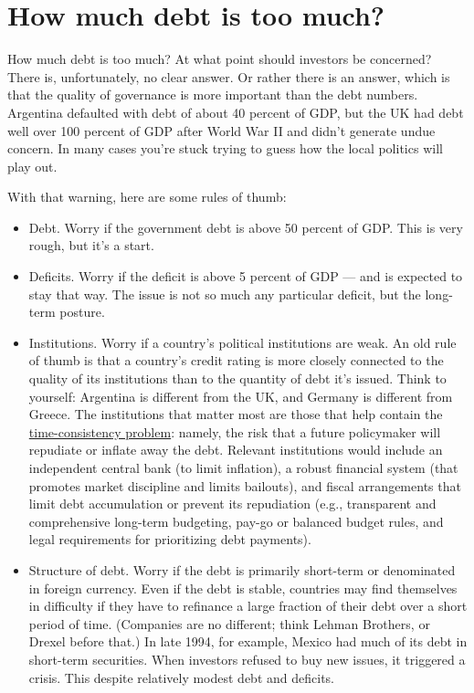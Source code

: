 \section{How much debt is too much?}

How much debt is too much?
At what point should investors be concerned?
There is, unfortunately, no clear answer.
Or rather there is an answer, which is that
the quality of governance is more important than the debt numbers.
Argentina defaulted with debt of about 40 percent of GDP,
but the UK had debt well over 100 percent of GDP after World War II
and didn't generate undue concern.
In many cases you're stuck trying to guess how the local politics will play out.

With that warning, here are some rules of thumb:
\begin{itemize}
\item Debt.  Worry if the government debt is above 50 percent of GDP.
This is very rough, but it's a start.

\item Deficits.  Worry if the deficit is above 5 percent of GDP ---
and is expected to stay that way.
The issue is not so much any particular deficit,
but the long-term posture.

\item Institutions.
Worry if a country's political institutions  are weak.
An old rule of thumb is that a country's credit rating is more closely
connected to the quality of its institutions
than to the quantity of debt it's issued.
Think to yourself:
Argentina is different from the UK, and Germany is different from Greece.
The institutions
that matter most are those that help contain the \hyperref[sec:time_cons]{time-consistency problem}:
namely, the risk that a future policymaker will repudiate or
inflate away the debt. Relevant institutions would include an
independent central bank  (to limit inflation), a robust financial system
(that promotes market discipline and limits bailouts), and fiscal arrangements
that limit debt accumulation or prevent its repudiation (e.g., transparent
and comprehensive long-term budgeting, pay-go or balanced budget
rules, and legal requirements for prioritizing debt payments).

\item Structure of debt.
Worry if the debt is primarily short-term or denominated in
foreign currency.
Even if the debt is stable, countries
may find themselves in difficulty if they have to refinance
a large fraction of their debt over a short period of time.
(Companies are no different; think Lehman Brothers, or Drexel before that.)
In late 1994, for example, Mexico had much of its debt in short-term
securities.
When investors refused to buy new issues, it triggered a crisis.
This despite relatively modest debt and deficits.


\end{itemize}
